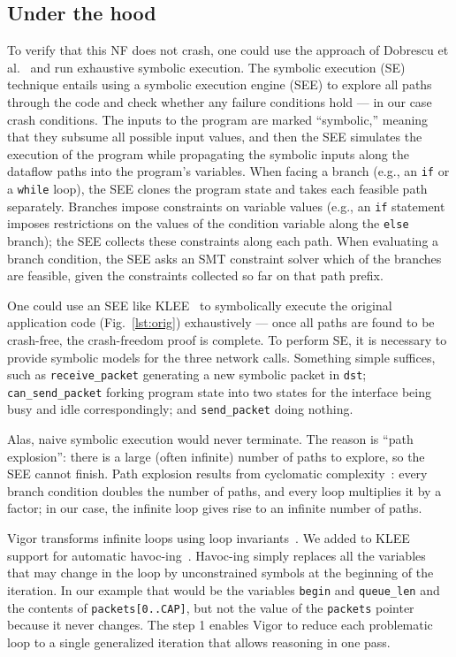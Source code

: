 \documentclass[letterpaper,twocolumn,10pt]{article}
\newcommand{\code}[1]{\lstinline{#1}}
\begin{document}
\subsection{Under the hood}
\label{sec:under-the-hood}

To verify that this NF does not crash, one could use the approach of Dobrescu et
al.~\cite{dobrescu2014software} and run exhaustive symbolic execution. The
symbolic execution (SE) technique entails using a symbolic execution engine
(SEE) to explore all paths through the code and check whether any failure
conditions hold --- in our case crash conditions. The inputs to the program are
marked ``symbolic,'' meaning that they subsume all possible input values, and
then the SEE simulates the execution of the program while propagating the
symbolic inputs along the dataflow paths into the program's variables. When
facing a branch (e.g., an \code{if} or a \code{while} loop), the SEE clones the
program state and takes each feasible path separately. Branches impose
constraints on variable values (e.g., an \code{if} statement imposes
restrictions on the values of the condition variable along the \code{else}
branch); the SEE collects these constraints along each path. When evaluating a
branch condition, the SEE asks an SMT constraint solver which of the branches
are feasible, given the constraints collected so far on that path prefix.

One could use an SEE like KLEE~\cite{cadar2008klee} to symbolically execute the
original application code (Fig.~\ref{lst:orig}) exhaustively --- once all paths
are found to be crash-free, the crash-freedom proof is complete. To perform SE,
it is necessary to provide symbolic models for the three network calls.
Something simple suffices, such as \code{receive_packet} generating a new
symbolic packet in \code{dst}; \code{can_send_packet} forking program state into
two states for the interface being busy and idle correspondingly; and
\code{send_packet} doing nothing.

Alas, naive symbolic execution would never terminate. The reason is ``path
explosion'': there is a large (often infinite) number of paths to explore, so
the SEE cannot finish. Path explosion results from cyclomatic
complexity~\cite{mccabe:cyclomatic}: every branch condition doubles the number
of paths, and every loop multiplies it by a factor; in our case, the infinite
loop gives rise to an infinite number of paths.

Vigor transforms infinite loops using loop
invariants~\cite[\S~2.1]{cormen2009introduction}. We added to KLEE support for
automatic havoc-ing~\cite{barnett2005boogie}. Havoc-ing simply replaces all the
variables that may change in the loop by unconstrained symbols at the beginning
of the iteration. In our example that would be the variables \code{begin} and
\code{queue_len} and the contents of \code{packets[0..CAP]}, but not the value
of the \code{packets} pointer because it never changes. The step 1 enables
Vigor to reduce each problematic loop to a single generalized iteration that
allows reasoning in one pass.
\end{document}
